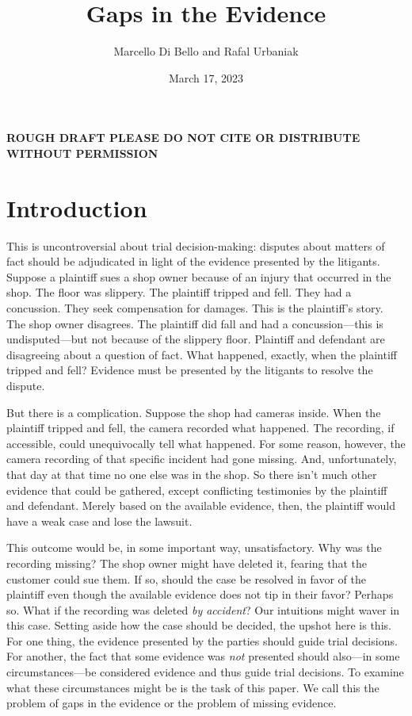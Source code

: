 \documentclass[
  10pt,
  dvipsnames,enabledeprecatedfontcommands]{scrartcl}
\title{Gaps in the Evidence}
\author{Marcello Di Bello and Rafal Urbaniak}
\date{March 17, 2023}
\begin{document}
\maketitle

\tableofcontents

\vspace{1cm}

\textbf{ROUGH DRAFT PLEASE DO NOT CITE OR DISTRIBUTE WITHOUT PERMISSION}

\vspace{6cm}

\hypertarget{introduction}{%
\section{Introduction}\label{introduction}}

This is uncontroversial about trial decision-making: disputes about
matters of fact should be adjudicated in light of the evidence presented
by the litigants. Suppose a plaintiff sues a shop owner because of an
injury that occurred in the shop. The floor was slippery. The plaintiff
tripped and fell. They had a concussion. They seek compensation for
damages. This is the plaintiff's story. The shop owner disagrees. The
plaintiff did fall and had a concussion---this is undisputed---but not
because of the slippery floor. Plaintiff and defendant are disagreeing
about a question of fact. What happened, exactly, when the plaintiff
tripped and fell? Evidence must be presented by the litigants to resolve
the dispute.

But there is a complication. Suppose the shop had cameras inside. When
the plaintiff tripped and fell, the camera recorded what happened. The
recording, if accessible, could unequivocally tell what happened. For
some reason, however, the camera recording of that specific incident had
gone missing. And, unfortunately, that day at that time no one else was
in the shop. So there isn't much other evidence that could be gathered,
except conflicting testimonies by the plaintiff and defendant. Merely
based on the available evidence, then, the plaintiff would have a weak
case and lose the lawsuit.

This outcome would be, in some important way, unsatisfactory. Why was
the recording missing? The shop owner might have deleted it, fearing
that the customer could sue them. If so, should the case be resolved in
favor of the plaintiff even though the available evidence does not tip
in their favor? Perhaps so. What if the recording was deleted \emph{by
accident}? Our intuitions might waver in this case. Setting aside how
the case should be decided, the upshot here is this. For one thing, the
evidence presented by the parties should guide trial decisions. For
another, the fact that some evidence was \textit{not} presented should
also---in some circumstances---be considered evidence and thus guide
trial decisions. To examine what these circumstances might be is the
task of this paper. We call this the problem of gaps in the evidence or
the problem of missing evidence.
\end{document}
